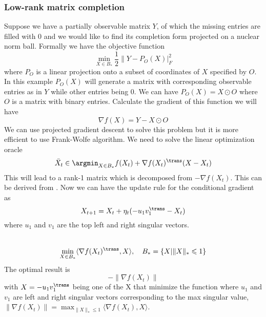 \subsubsection{Low-rank matrix completion}
Suppose we have a partially observable matrix $Y$, of which the missing entries are filled with 0 and we would like to find its completion form projected on a nuclear norm ball. Formally we have the objective function
\[
\min_{X\in B_*}\frac{1}{2}\|Y-P_O(X)|_F^2
\]
where $P_O$ is a linear projection onto a subset of coordinates of $X$ specified by $O$. In this example $P_O(X)$ will generate a matrix with corresponding observable entries as in $Y$ while other entries being 0. We can have $P_O(X) = X \odot O$ where $O$ is a matrix with binary entries.
Calculate the gradient of this function we will have
\[
\nabla f(X) = Y-X \odot O
\]
We can use projected gradient descent to solve this problem but it is more efficient to use Frank-Wolfe algorithm. We need to solve the linear optimization oracle
\[
\bar{X}_t\in \argmin_{X\in{B_*}}f(X_t)+\nabla f(X_t)^\trans(X-X_t)
\]
This will lead to a rank-1 matrix which is decomposed from $-\nabla f(X_t)$. This can be derived from . Now we can have the update rule for the conditional gradient as
\[
X_{t+1} = X_t + \eta_t(-u_1v_1^\trans - X_t)
\]
where $u_1$ and $v_1$ are the top left and right singular vectors.\\ \\

\begin{lemma}
\[
\min_{X\in B_*}\langle\nabla f(X_t)^\trans,X\rangle,\quad B_*=\{X|\|X\|_*\leqslant 1\}
\]
The optimal result is \[-\|\nabla f(X_t)\|\] with $X=-u_1v_1^\trans$ being one of the X that minimize the function where
$u_1$ and $v_1$ are left and right singular vectors corresponding to the max singular value, $\|\nabla f(X_t)\|=\max_{\|X\|_*\leqslant 1}\langle\nabla f(X_t),X\rangle$.\\
\end{lemma}

